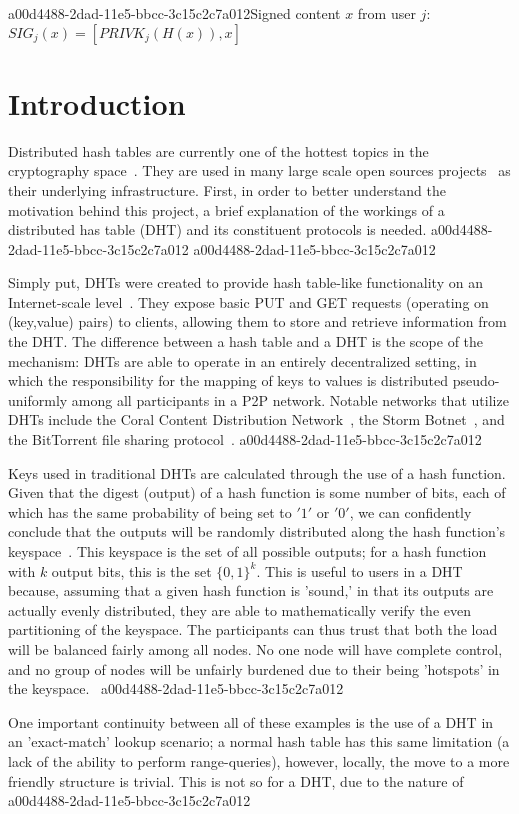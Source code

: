 \documentclass[12pt]{article}
\begin{document}
a00d4488-2dad-11e5-bbcc-3c15c2c7a012Signed content $x$ from user $j$: $SIG_j(x) = \left[ PRIVK_j( H(x) ), x \right]$

\section{Introduction}
\par Distributed hash tables are currently one of the hottest topics in the cryptography space~\cite{Stoica:2001dj,Rowstron:2001ea,Ratnasamy:2001wn}. They are used in many large scale open sources projects~\cite{Freitas:2013tb,Xu:2010vs,Perfitt:2010fh} as their underlying infrastructure. First, in order to better understand the motivation behind this project, a brief explanation of the workings of a distributed has table (DHT) and its constituent protocols is needed.
a00d4488-2dad-11e5-bbcc-3c15c2c7a012
a00d4488-2dad-11e5-bbcc-3c15c2c7a012\par Simply put, DHTs were created to provide hash table-like functionality on an Internet-scale level~\cite{Ratnasamy:2001wn}. They expose basic PUT and GET requests (operating on (key,value) pairs) to clients, allowing them to store and retrieve information from the DHT. The difference between a hash table and a DHT is the scope of the mechanism: DHTs are able to operate in an entirely decentralized setting, in which the responsibility for the mapping of keys to values is distributed pseudo-uniformly among all participants in a P2P network. Notable networks that utilize DHTs include the Coral Content Distribution Network~\cite{Freedman:2004vb}, the Storm Botnet~\cite{Holz:2008uk}, and the BitTorrent file sharing protocol~\cite{Cohen:y1_8mBnw}.
a00d4488-2dad-11e5-bbcc-3c15c2c7a012
\par Keys used in traditional DHTs are calculated through the use of a hash function. Given that the digest (output) of a hash function is some number of bits, each of which has the same probability of being set to $'1'$ or $'0'$, we can confidently conclude that the outputs will be randomly distributed along the hash function's keyspace~. This keyspace is the set of all possible outputs; for a hash function with $k$ output bits, this is the set $\{0,1\}^k$. This is useful to users in a DHT because, assuming that a given hash function is 'sound,' in that its outputs are actually evenly distributed, they are able to mathematically verify the even partitioning of the keyspace. The participants can thus trust that both the load will be balanced fairly among all nodes. No one node will have complete control, and no group of nodes will be unfairly burdened due to their being 'hotspots' in the keyspace.~
a00d4488-2dad-11e5-bbcc-3c15c2c7a012
\par One important continuity between all of these examples is the use of a DHT in an 'exact-match' lookup scenario; a normal hash table has this same limitation (a lack of the ability to perform range-queries), however, locally, the move to a more friendly structure is trivial. This is not so for a DHT, due to the nature of
a00d4488-2dad-11e5-bbcc-3c15c2c7a012\printbibliography
\end{document}
